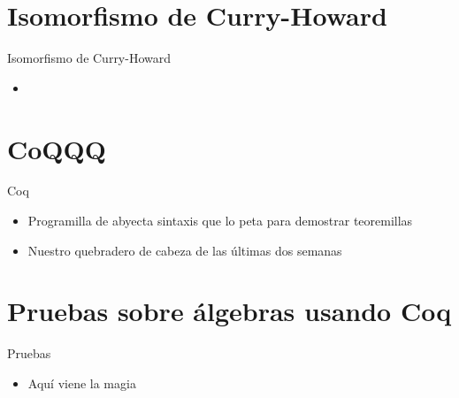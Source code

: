 \documentclass[10pt]{beamer}
\begin{document}
\section{Isomorfismo de Curry-Howard}

\begin{frame}[fragile]{Isomorfismo de Curry-Howard}

  \begin{itemize}
  \item
  \end{itemize}

\end{frame}

\section{CoQQQ}

\begin{frame}[fragile]{Coq}

  \begin{itemize}
  \item Programilla de abyecta sintaxis que lo peta para demostrar teoremillas
  \item Nuestro quebradero de cabeza de las últimas dos semanas
  \end{itemize}

\end{frame}

\section{Pruebas sobre álgebras usando Coq}

\begin{frame}[fragile]{Pruebas}

  \begin{itemize}
  \item Aquí viene la magia
  \end{itemize}

\end{frame}
\end{document}
